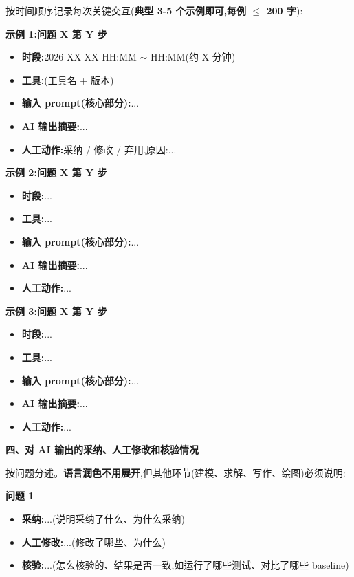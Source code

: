 \documentclass[a4paper,12pt]{article}
\begin{document}
按时间顺序记录每次关键交互(\textbf{典型 3-5 个示例即可,每例 $\le$ 200 字}):

\vspace{0.5em}
\noindent\textbf{示例 1:问题 X 第 Y 步}
\begin{itemize}[itemindent=2em]
  \item \textbf{时段:}2026-XX-XX HH:MM $\sim$ HH:MM(约 X 分钟)
  \item \textbf{工具:}(工具名 + 版本)
  \item \textbf{输入 prompt(核心部分):}...
  \item \textbf{AI 输出摘要:}...
  \item \textbf{人工动作:}采纳 / 修改 / 弃用,原因:...
\end{itemize}

\vspace{0.5em}
\noindent\textbf{示例 2:问题 X 第 Y 步}
\begin{itemize}[itemindent=2em]
  \item \textbf{时段:}...
  \item \textbf{工具:}...
  \item \textbf{输入 prompt(核心部分):}...
  \item \textbf{AI 输出摘要:}...
  \item \textbf{人工动作:}...
\end{itemize}

\vspace{0.5em}
\noindent\textbf{示例 3:问题 X 第 Y 步}
\begin{itemize}[itemindent=2em]
  \item \textbf{时段:}...
  \item \textbf{工具:}...
  \item \textbf{输入 prompt(核心部分):}...
  \item \textbf{AI 输出摘要:}...
  \item \textbf{人工动作:}...
\end{itemize}

\noindent\textbf{四、对 AI 输出的采纳、人工修改和核验情况}

按问题分述。\textbf{语言润色不用展开},但其他环节(建模、求解、写作、绘图)必须说明:

\vspace{0.5em}
\noindent\textbf{问题 1}
\begin{itemize}[itemindent=2em]
  \item \textbf{采纳:}...(说明采纳了什么、为什么采纳)
  \item \textbf{人工修改:}...(修改了哪些、为什么)
  \item \textbf{核验:}...(怎么核验的、结果是否一致,如运行了哪些测试、对比了哪些 baseline)
\end{itemize}
\end{document}

